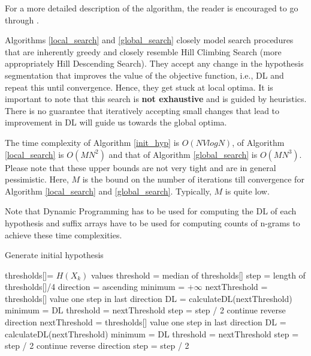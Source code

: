 \documentclass[runningheads]{llncs}
\begin{document}
For a more detailed description of the algorithm, the reader is encouraged to go through \cite{zhikov2013efficient}.

Algorithms \ref{local_search} and \ref{global_search} closely model search procedures that are inherently greedy and closely resemble Hill Climbing Search (more appropriately Hill Descending Search). They accept any change in the hypothesis segmentation that improves the value of the objective function, i.e., DL and repeat this until convergence. Hence, they get stuck at local optima. It is important to note that this search is \textbf{not exhaustive} and is guided by heuristics. There is no guarantee that iteratively accepting small changes that lead to improvement in DL will guide us towards the global optima.  

The time complexity of Algorithm \ref{init_hyp} is $O(NVlogN)$, of Algorithm \ref{local_search} is $O(MN^2)$ and that of Algorithm \ref{global_search} is $O(MN^3)$. Please note that these upper bounds are not very tight and are in general pessimistic. Here, $M$ is the bound on the number of iterations till convergence for Algorithm \ref{local_search} and \ref{global_search}. Typically, $M$ is quite low. 

Note that Dynamic Programming has to be used for computing the DL of each hypothesis and suffix arrays have to be used for computing counts of n-grams to achieve these time complexities.

\begin{algorithm}
	\caption{Generate initial hypothesis}
	\label{init_hyp}
	\begin{algorithmic}[1]
        \State thresholds[]= $H(X_k)$ values
        \State threshold = median of thresholds[]
        \State step = length of thresholds[]/4
        \State direction = ascending
        \State minimum = $+\infty$
            \State nextThreshold = thresholds[] value one step in last direction
            \State DL = calculateDL(nextThreshold)
                \State minimum = DL
                \State threshold = nextThreshold
                \State step = step / 2
                \State continue
            \EndIf
            \State reverse direction
            \State nextThreshold = thresholds[] value one step in last direction
            \State DL = calculateDL(nextThreshold)
                \State minimum = DL
                \State threshold = nextThreshold
                \State step = step / 2
                \State continue
            \EndIf
            \State reverse direction
            \State step = step / 2
        \EndWhile
	\end{algorithmic}
\end{algorithm}
\end{document}

